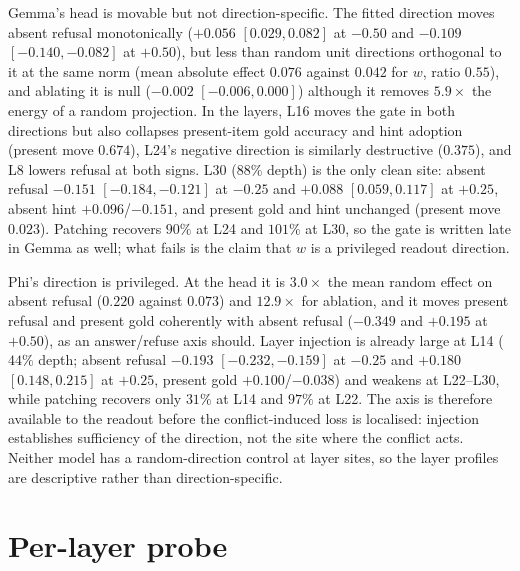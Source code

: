\documentclass[10pt]{article}
\newcommand{\wdir}{w}
\begin{document}
Gemma's head is movable but not direction-specific. The fitted direction moves
absent refusal monotonically ($+0.056$ $[0.029,0.082]$ at $-0.50$ and $-0.109$
$[-0.140,-0.082]$ at $+0.50$), but less than random unit directions orthogonal
to it at the same norm (mean absolute effect $0.076$ against $0.042$ for
$\wdir$, ratio $0.55$), and ablating it is null ($-0.002$ $[-0.006,0.000]$)
although it removes $5.9\times$ the energy of a random projection. In the
layers, L16 moves the gate in both directions but also collapses present-item
gold accuracy and hint adoption (present move $0.674$), L24's negative
direction is similarly destructive ($0.375$), and L8 lowers refusal at both
signs. L30 (88\% depth) is the only clean site: absent refusal $-0.151$
$[-0.184,-0.121]$ at $-0.25$ and $+0.088$ $[0.059,0.117]$ at $+0.25$, absent
hint $+0.096$/$-0.151$, and present gold and hint unchanged (present move
$0.023$). Patching recovers $90\%$ at L24 and $101\%$ at L30, so the gate is
written late in Gemma as well; what fails is the claim that $\wdir$ is a
privileged readout direction.

Phi's direction is privileged. At the head it is $3.0\times$ the mean random
effect on absent refusal ($0.220$ against $0.073$) and $12.9\times$ for
ablation, and it moves present refusal and present gold coherently with absent
refusal ($-0.349$ and $+0.195$ at $+0.50$), as an answer/refuse axis should.
Layer injection is already large at L14 ($44\%$ depth; absent refusal
$-0.193$ $[-0.232,-0.159]$ at $-0.25$ and $+0.180$ $[0.148,0.215]$ at
$+0.25$, present gold $+0.100$/$-0.038$) and weakens at L22--L30, while
patching recovers only $31\%$ at L14 and $97\%$ at L22. The axis is therefore
available to the readout before the conflict-induced loss is localised:
injection establishes sufficiency of the direction, not the site where the
conflict acts. Neither model has a random-direction control at layer sites, so
the layer profiles are descriptive rather than direction-specific.

\section{Per-layer probe}
\label{app:layer}
\end{document}
